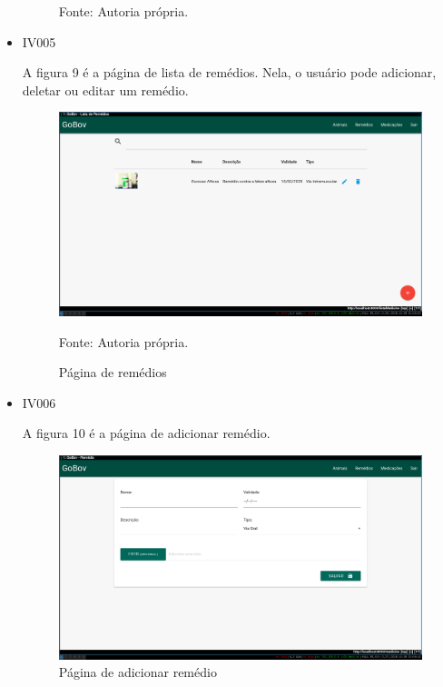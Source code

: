 \begin{itemize}
\begin{figure}[H]
\begin{center}
		Fonte: Autoria própria.
	\end{center}
\end{figure}


\item IV005

A figura 9 é a página de lista de remédios. Nela, o usuário pode adicionar, deletar ou editar um remédio.
\begin{figure}[H]
	\begin{center}
		\caption{Página de remédios}
		\includegraphics[width=\textwidth]{../img/prototipos/listaRemedio.png}

		Fonte: Autoria própria.
	\end{center}
\end{figure}

\item IV006

A figura 10 é a página de adicionar remédio.
\begin{figure}[H]
	\begin{center}
		\caption{Página de adicionar remédio}
		\includegraphics[width=\textwidth]{../img/prototipos/addRemedio.png}


\end{center}
\end{figure}
\end{itemize}
